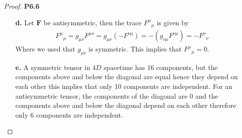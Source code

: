 \documentclass[11pt]{article}
\theoremstyle{definition}
\begin{document}
\begin{proof}{\textbf{P6.6}}
\begin{itemize}
        \item [\textbf{d.}] Let $\bm{F}$ be antisymmetric, then the trace
        ${F^\mu}_\mu$ is given by
        \begin{align*}
            {F^\mu}_\mu = g_{\mu\nu}F^{\mu\nu} = g_{\mu\nu}(-F^{\nu\mu})
            = -(g_{\nu\mu}F^{\nu\mu}) = -{F^\nu}_\nu
        \end{align*}
        Where we used that $g_{\mu\nu}$ is symmetric.
        This implies that ${F^{\mu}}_\mu = 0$.

        \item [\textbf{e.}] A symmetric tensor in $4D$ spacetime has
        16 components, but the components above and below the diagonal are equal
        hence they depend on each other this implies that only 10 components
        are independent.
        For an antisymmetric tensor, the components of the diagonal are 0
        and the components above and below the diagonal depend on each other
        therefore only 6 components are independent.
    \end{itemize}
\end{proof}
\cleardoublepage
\end{document}
